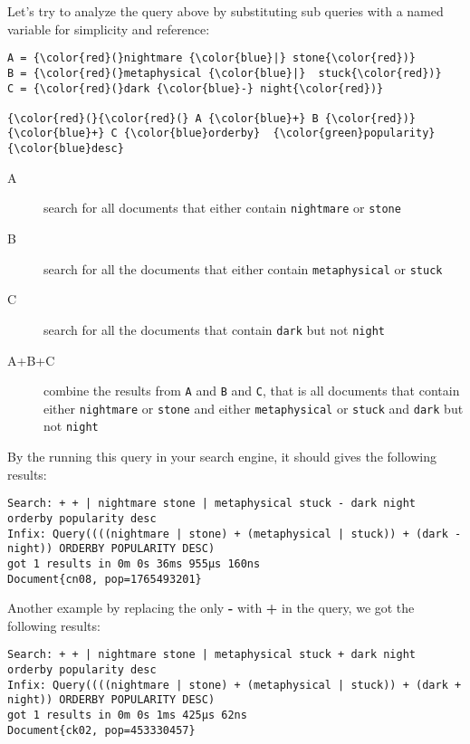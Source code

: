 \documentclass[11pt]{article}
\begin{document}
Let's try to analyze the query above by substituting sub queries with a named variable for simplicity and reference:
\begin{footnotesize}
\begin{Verbatim}[commandchars=\\\{\}]
A = {\color{red}(}nightmare {\color{blue}|} stone{\color{red})}
B = {\color{red}(}metaphysical {\color{blue}|}  stuck{\color{red})}
C = {\color{red}(}dark {\color{blue}-} night{\color{red})}

{\color{red}(}{\color{red}(} A {\color{blue}+} B {\color{red})} {\color{blue}+} C {\color{blue}orderby}  {\color{green}popularity}  {\color{blue}desc}
\end{Verbatim}
\end{footnotesize} 

\begin{description}
\item[A]  search for all documents that either contain \texttt{nightmare} or \texttt{stone}
\item[B]  search for all the documents that either contain \texttt{metaphysical} or \texttt{stuck} 
\item[C]  search for all the documents that contain \texttt{dark} but not \texttt{night}
\item[A+B+C] combine the results from \texttt{A} and \texttt{B} and \texttt{C}, that is all documents that contain either \texttt{nightmare} or \texttt{stone} and either \texttt{metaphysical} or \texttt{stuck} and \texttt{dark} but not \texttt{night}
\end{description}

By the running this query in your search engine, it should gives the following results:

\begin{footnotesize}
\begin{verbatim}
Search: + + | nightmare stone | metaphysical stuck - dark night orderby popularity desc
Infix: Query((((nightmare | stone) + (metaphysical | stuck)) + (dark - night)) ORDERBY POPULARITY DESC)
got 1 results in 0m 0s 36ms 955µs 160ns
Document{cn08, pop=1765493201}
\end{verbatim}
\end{footnotesize}

Another example by replacing the only \textbf{-} with \textbf{+} in the query, we got the following results:

\begin{footnotesize}
\begin{verbatim}
Search: + + | nightmare stone | metaphysical stuck + dark night orderby popularity desc
Infix: Query((((nightmare | stone) + (metaphysical | stuck)) + (dark + night)) ORDERBY POPULARITY DESC)
got 1 results in 0m 0s 1ms 425µs 62ns
Document{ck02, pop=453330457}
\end{verbatim}
\end{footnotesize}
\end{document}
